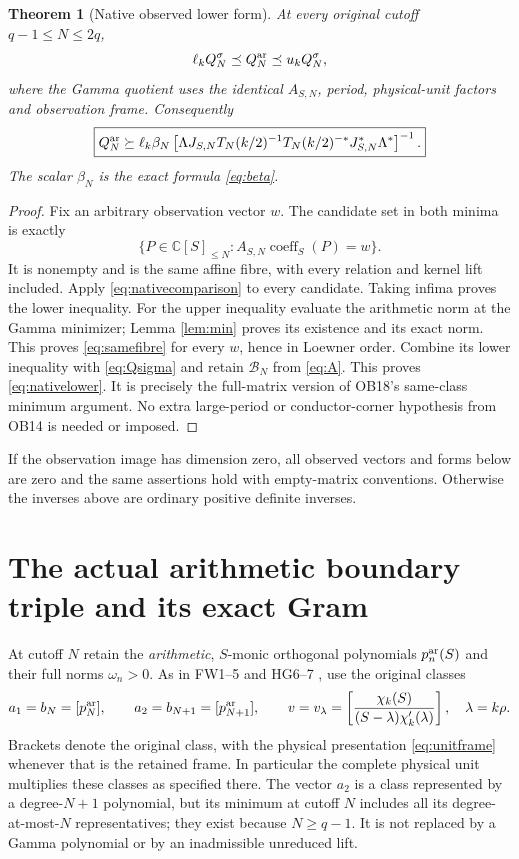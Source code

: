 \documentclass[11pt]{article}
\newtheorem{theorem}{Theorem}
\newcommand{\C}{\mathbb C}
\begin{document}
\begin{theorem}[Native observed lower form]\label{thm:nativelower}
At every original cutoff $q-1\le N\le2q$,
\begin{equation}\label{eq:samefibre}
 \ell_kQ_N^\sigma\preceq Q_N^{\rm ar}\preceq u_kQ_N^\sigma,
\end{equation}
where the Gamma quotient uses the identical $A_{S,N}$, period,
physical-unit factors and observation frame.  Consequently
\begin{equation}\label{eq:nativelower}
 \boxed{Q_N^{\rm ar}\succeq
 \ell_k\beta_N\left[
 \Lambda J_{S,N}T_N(k/2)^{-1}T_N(k/2)^{-*}J_{S,N}^*\Lambda^*
 \right]^{-1}.}
\end{equation}
The scalar $\beta_N$ is the exact formula \eqref{eq:beta}.
\end{theorem}
\begin{proof}
Fix an arbitrary observation vector $w$.  The candidate set in both
minima is exactly
\[
 \{P\in\C[S]_{\le N}:A_{S,N}\operatorname{coeff}_S(P)=w\}.
\]
It is nonempty and is the same affine fibre, with every relation and
kernel lift included.  Apply \eqref{eq:nativecomparison} to every
candidate.  Taking infima proves the lower inequality.  For the upper
inequality evaluate the arithmetic norm at the Gamma minimizer;
Lemma \ref{lem:min} proves its existence and its exact norm.  This
proves \eqref{eq:samefibre} for every $w$, hence in Loewner order.
Combine its lower inequality with \eqref{eq:Qsigma} and retain
$\mathcal B_N$ from \eqref{eq:A}.  This proves \eqref{eq:nativelower}.
It is precisely the full-matrix version of OB18's same-class minimum
argument.  No extra large-period or conductor-corner hypothesis from
OB14 is needed or imposed.
\end{proof}

If the observation image has dimension zero, all observed vectors and
forms below are zero and the same assertions hold with empty-matrix
conventions.  Otherwise the inverses above are ordinary positive
definite inverses.

\section{The actual arithmetic boundary triple and its exact Gram}

At cutoff $N$ retain the \emph{arithmetic}, $S$-monic orthogonal
polynomials $p_n^{\rm ar}(S)$ and their full norms $\omega_n>0$.
As in FW1--5 and HG6--7 \cite{FW,HG}, use the original classes
\begin{equation}\label{eq:nativetriple}
 a_1=b_N=[p_N^{\rm ar}],\qquad
 a_2=b_{N+1}=[p_{N+1}^{\rm ar}],\qquad
 v=v_\lambda=\left[\frac{\chi_k(S)}{(S-\lambda)\chi_k'(\lambda)}\right],
 \quad\lambda=k\rho.
\end{equation}
Brackets denote the original class, with the physical presentation
\eqref{eq:unitframe} whenever that is the retained frame.  In particular
the complete physical unit multiplies these classes as specified there.
The vector $a_2$ is a class represented by a degree-$N+1$ polynomial,
but its minimum at cutoff $N$ includes all its degree-at-most-$N$
representatives; they exist because $N\ge q-1$.  It is not replaced
by a Gamma polynomial or by an inadmissible unreduced lift.
\end{document}

